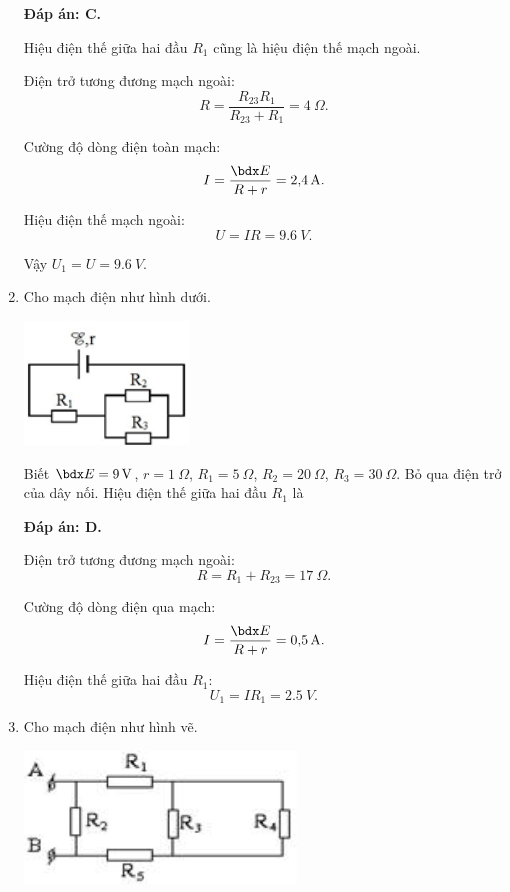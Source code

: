 \begin{enumerate}[label=\bfseries Câu \arabic*:]
{	}
	\loigiai
	{	\textbf{Đáp án: C.}
		
		Hiệu điện thế giữa hai đầu $R_1$ cũng là hiệu điện thế mạch ngoài.
		
		Điện trở tương đương mạch ngoài:
		$$R=\dfrac{R_{23} R_1}{R_{23} + R_1} = \SI{4}{\Omega}.$$
		
		Cường độ dòng điện toàn mạch:
		$$I=\dfrac{\calE}{R + r} = \SI{2.4}{A}.$$
		
		Hiệu điện thế mạch ngoài:
		$$U=IR = \SI{9.6}{V}.$$
		
		Vậy $U_1 = U = \SI{9.6}{V}$.
	}
	\item {}
	
	\cauhoi
	{Cho mạch điện như hình dưới.
		\begin{center}
			\includegraphics{../figs/VN11-2021-PH-TP016-3.png}
		\end{center}
	Biết $\calE = \SI{9}{V}$, $r=\SI{1}{\Omega}$, $R_1=\SI{5}{\Omega}$, $R_2=\SI{20}{\Omega}$, $R_3=\SI{30}{\Omega}$. Bỏ qua điện trở của dây nối. Hiệu điện thế giữa hai đầu $R_1$ là
		
	}
	\loigiai
	{	\textbf{Đáp án: D.}
		
		Điện trở tương đương mạch ngoài:
		$$R=R_1 + R_{23} = \SI{17}{\Omega}.$$
		
		Cường độ dòng điện qua mạch:
		$$I=\dfrac{\calE}{R + r} = \SI{0.5}{A}.$$
		
		Hiệu điện thế giữa hai đầu $R_1$:
		$$U_1 = I R_1 = \SI{2.5}{V}.$$
	}
	\item {}
	
	\cauhoi
	{Cho mạch điện như hình vẽ.
		\begin{center}
			\includegraphics{../figs/VN11-2021-PH-TP016-4.png}
		\end{center}
	
}
\end{enumerate}
